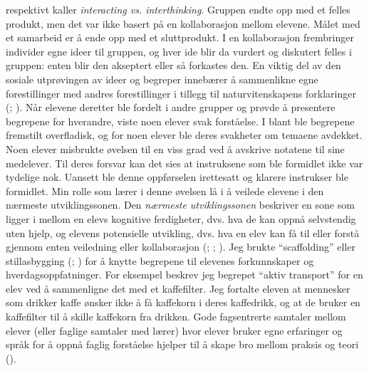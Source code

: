 \documentclass[main.tex]{subfiles}
\begin{document}
respektivt kaller \emph{interacting vs. interthinking}. 
\newline
\newline
Gruppen endte opp med et felles produkt, 
men det var ikke basert på en kollaborasjon mellom elevene. Målet med et samarbeid er å ende opp 
med et sluttprodukt. I en kollaborasjon frembringer individer egne ideer til gruppen, og hver ide
blir da vurdert og diskutert felles i gruppen: enten blir den akseptert eller så forkastes den.
En viktig del av den sosiale utprøvingen av ideer og begreper innebærer å sammenlikne egne 
forestillinger med andres forestillinger i tillegg til naturvitenskapens forklaringer 
(; ).
\newline
\newline
Når elevene deretter ble fordelt i andre grupper og prøvde å presentere begrepene for hverandre, 
viste noen elever svak forståelse. I blant ble begrepene fremstilt overfladisk, og for noen elever 
ble deres svakheter om temaene avdekket. Noen elever misbrukte øvelsen til en viss grad ved å 
avskrive notatene til sine medelever. Til deres forsvar kan det sies at instruksene som ble formidlet 
ikke var tydelige nok. Uansett ble denne oppførselen irettesatt og klarere instrukser ble formidlet.
\newline
\newline
Min rolle som lærer i denne øvelsen lå i å veilede elevene i den nærmeste utviklingssonen.
Den \emph{nærmeste utviklingssonen} beskriver en sone som ligger i mellom en elevs kognitive 
ferdigheter, dvs. hva de kan oppnå selvstendig uten hjelp, og elevens potensielle utvikling, dvs. 
hva en elev kan få til eller forstå gjennom enten veiledning eller kollaborasjon 
(; ; ). Jeg brukte ``scaffolding'' 
eller stillasbygging (; ) for å knytte begrepene til elevenes 
forkunnskaper og hverdagsoppfatninger. For eksempel beskrev jeg begrepet ``aktiv transport'' for
en elev ved å sammenligne det med et kaffefilter. Jeg fortalte eleven at mennesker som 
drikker kaffe ønsker ikke å få kaffekorn i deres kaffedrikk, og at de bruker en kaffefilter til å
skille kaffekorn fra drikken. Gode fagsentrerte samtaler mellom elever (eller faglige 
samtaler med lærer) hvor elever bruker egne erfaringer og språk for å oppnå faglig forståelse 
hjelper til å skape bro mellom praksis og teori ().
\end{document}
